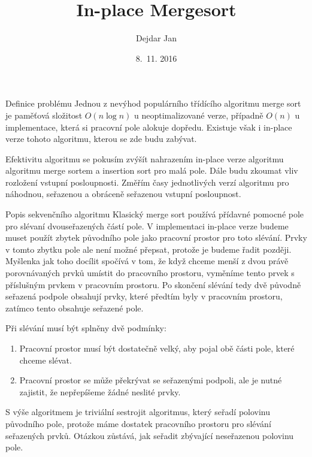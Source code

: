 \documentclass[a4paper,11pt]{article}
\title{In-place Mergesort}
\author{Dejdar Jan}
\date{8.~11. 2016}
\begin{document}
\maketitle


\begin{section}{Definice problému}
Jednou z nevýhod populárního třídícího algoritmu merge sort je paměťová
složitost $O(n\log{n})$ u neoptimalizované verze, případně $O(n)$ u implementace,
která si pracovní pole alokuje dopředu. Existuje však i in-place verze tohoto algoritmu,
kterou se zde budu zabývat. 

Efektivitu algoritmu se pokusím zvýšít nahrazením in-place verze algoritmu algoritmu 
merge sortem a insertion sort pro malá pole. Dále budu zkoumat vliv rozložení vstupní 
posloupnosti. Změřím časy jednotlivých verzí algoritmu pro náhodnou, seřazenou a obráceně
seřazenou vstupní posloupnost.

\begin{subsection}{Popis sekvenčního algoritmu}
Klasický merge sort používá přídavné pomocné pole pro slévaní dvouseřazených částí pole.
V implementaci in-place verze budeme muset použít zbytek původního pole jako pracovní prostor
pro toto slévání. Prvky v tomto zbytku pole ale není možné přepsat, protože je budeme řadit později.
Myšlenka jak toho docílit spočívá v tom, že když chceme menší z dvou právě porovnávaných prvků
umístit do pracovního prostoru, vyměníme tento prvek s příslušným prvkem v pracovním prostoru.
Po skončení slévání tedy dvě původně seřazená podpole obsahují prvky, které předtím byly v
pracovním prostoru, zatímco tento obsahuje seřazené pole.

Při slévání musí být splněny dvě podmínky:
\begin{enumerate}
	\item Pracovní prostor musí být dostatečně velký, aby pojal obě části pole, které chceme slévat.
	\item Pracovní prostor se může překrývat se seřazenými podpoli, ale je nutné zajistit, že nepřepíšeme
		žádné neslité prvky.
\end{enumerate}
\pagebreak

S výše algoritmem je triviální sestrojit algoritmus, který seřadí polovinu původního pole, 
protože máme dostatek pracovního prostoru pro slévání seřazených prvků. Otázkou zůstává, jak
seřadit zbývající neseřazenou polovinu pole.



\end{subsection}
\end{section}
\end{document}
